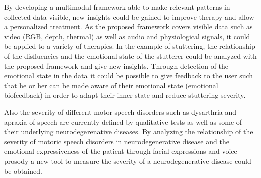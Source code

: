 By developing a multimodal framework able to make relevant patterns in collected data visible, new insights could be gained to improve therapy and allow a personalized treatment. As the proposed framework covers visible data such as video (RGB, depth, thermal) as well as audio and physiological signals, it could be applied to a variety of therapies. In the example of stuttering, the relationship of the disfluencies and the emotional state of the stutterer could be analyzed with the proposed framework and give new insights. Through detection of the emotional state in the data it could be possible to give feedback to the user such that he or her can be made aware of their emotional state (emotional biofeedback) in order to adapt their inner state and reduce stuttering severity. \par


Also the severity of different motor speech disorders such as dysarthria and apraxia of speech are currently defined by qualitative tests as well as some of their underlying neurodegerenative diseases. By analyzing the relationship of the severity of motoric speech disorders in neurodegenerative disease and the emotional expressiveness of the patient through facial expressions and voice prosody a new tool to measure the severity of a neurodegenerative disease could be obtained.



\begin{comment}
The goal of this thesis is to analyze facial activity, produced by speech therapy exercises and facial paralysis exercises, recorded by RGB, depth, and infrared cameras during several therapy sessions in order to develop a clinical decision support system that uses multimodal data to support health professionals in their decisions through exercise suggestions.

As seen in Fig.~\ref{fig:project}, the scope of this work is limited on exploring feature representations for video data and introducing text information into the machine learning framework, which is also part of this thesis, in order to represent progress done by the patient on different time instants (temporal modeling). In the following, the milestones to reach the goal of this thesis will be presented and explained. \\

\textbf{Hypothesis 1 -} A direct mapping between speech (US English and/or Portuguese) and facial muscle contraction can be made using data collected from RGB, depth, and infrared cameras by differentiating facial activity caused by speech from facial activity caused by facial expressions.


\textbf{Hypothesis 2 -} 

Considering clinical medical data existing in the Electronic Health Records, in particular, multimodal time series of data from health sensors and medical notes collected at each patient visit, we wish to recognize health/clinical patterns to support health professionals in their decisions through (i) suggestions and (ii) similar examples.

\end{comment}
